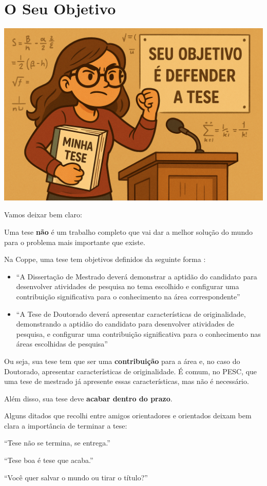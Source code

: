 \chapter{O Seu Objetivo}

\begin{center}
\includegraphics[width=0.5\linewidth]{Images/defender.png}    
\end{center}
\vspace{0.5cm}


Vamos deixar bem claro:


Uma tese \textbf{não} é um trabalho completo que vai dar a melhor solução do mundo para o problema mais importante que existe.

Na Coppe, uma tese tem objetivos definidos da seguinte forma :
\begin{itemize}
\item	``A Dissertação de Mestrado deverá demonstrar a aptidão do candidato para desenvolver atividades de pesquisa no tema escolhido e configurar uma contribuição significativa para o conhecimento na área correspondente''
\item	``A Tese de Doutorado deverá apresentar características de originalidade, demonstrando a aptidão do candidato para desenvolver atividades de pesquisa, e configurar uma contribuição significativa para o conhecimento nas áreas escolhidas de pesquisa''
\end{itemize}

Ou seja, sua tese tem que ser uma \textbf{contribuição} para a área e, no caso do Doutorado, apresentar características de originalidade. É comum, no PESC, que uma tese de mestrado já apresente essas características, mas não é necessário.

Além disso, sua tese deve \textbf{acabar dentro do prazo}.

Alguns ditados que recolhi entre amigos orientadores e orientados deixam bem clara a importância de terminar a tese:

\begin{center}
``Tese não se termina, se entrega.''

``Tese boa é tese que acaba.''

``Você quer salvar o mundo ou tirar o título?''
    
\end{center}

